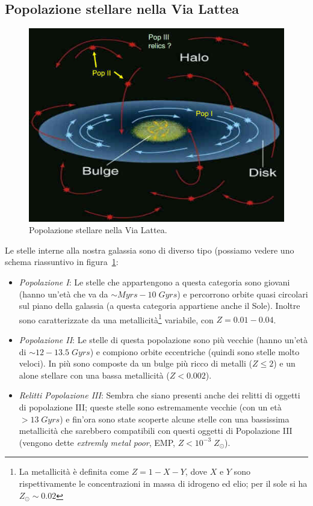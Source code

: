 \subsection{Popolazione stellare nella Via Lattea} \label{pop-stellare-via-lattea}
\begin{figure}
    \centering
    \includegraphics[width = 0.5 \textwidth]{immagini/popolazione-stellare-via-lattea.jpg}
    \caption{Popolazione stellare nella Via Lattea.}
    \label{fig:popolazione-stellare-via-lattea}
\end{figure}
Le stelle interne alla nostra galassia sono di diverso tipo (possiamo vedere uno schema riassuntivo in figura~\ref{fig:popolazione-stellare-via-lattea}:
\begin{itemize}
    \item \emph{Popolazione I}: Le stelle che appartengono a questa categoria sono giovani (hanno un'età che va da $\sim \si{Myrs} - 10 \;\si{Gyrs}$) e percorrono orbite quasi circolari sul piano della galassia (a questa categoria appartiene anche il Sole). Inoltre sono caratterizzate da una metallicità\footnote{La metallicità è definita come $Z = 1-X-Y$, dove $X$ e $Y$ sono rispettivamente le concentrazioni in massa di idrogeno ed elio; per il sole si ha $Z_{\odot}\sim 0.02$} variabile, con $Z=0.01-0.04$. 
    \item \emph{Popolazione II}: Le stelle di questa popolazione sono più vecchie (hanno un'età di $\sim 12 - 13.5 \; \si{Gyrs}$) e compiono orbite eccentriche (quindi sono stelle molto veloci). In più sono composte da un bulge più ricco di metalli ($Z \leq 2$) e un alone stellare con una bassa metallicità ($Z < 0.002$).
    \item \emph{Relitti Popolazione III}: Sembra che siano presenti anche dei relitti di oggetti di popolazione III; queste stelle sono estremamente vecchie (con un età $> 13 \; \si{Gyrs}$) e fin'ora sono state scoperte alcune stelle con una bassissima metallicità che sarebbero compatibili con questi oggetti di Popolazione III (vengono dette \emph{extremly metal poor}, EMP, $Z < 10^{-3} \;Z_{\odot}$).
\end{itemize}

